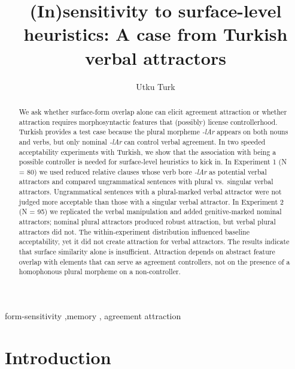 \documentclass[
  authoryear,
  3p]{elsarticle}
\begin{document}
\begin{frontmatter}
\title{(In)sensitivity to surface-level heuristics: A case from Turkish
verbal attractors}
\author[1]{Utku Turk%
%
}



        
\begin{abstract}
We ask whether surface-form overlap alone can elicit agreement
attraction or whether attraction requires morphosyntactic features that
(possibly) license controllerhood. Turkish provides a test case because
the plural morpheme \emph{-lAr} appears on both nouns and verbs, but
only nominal \emph{-lAr} can control verbal agreement. In two speeded
acceptability experiments with Turkish, we show that the association
with being a possible controller is needed for surface-level heuristics
to kick in. In Experiment 1 (N = 80) we used reduced relative clauses
whose verb bore \emph{-lAr} as potential verbal attractors and compared
ungrammatical sentences with plural vs.~singular verbal attractors.
Ungrammatical sentences with a plural-marked verbal attractor were not
judged more acceptable than those with a singular verbal attractor. In
Experiment 2 (N = 95) we replicated the verbal manipulation and added
genitive-marked nominal attractors; nominal plural attractors produced
robust attraction, but verbal plural attractors did not. The
within-experiment distribution influenced baseline acceptability, yet it
did not create attraction for verbal attractors. The results indicate
that surface similarity alone is insufficient. Attraction depends on
abstract feature overlap with elements that can serve as agreement
controllers, not on the presence of a homophonous plural morpheme on a
non-controller.
\end{abstract}





\begin{keyword}
    form-sensitivity \sep memory \sep 
    agreement attraction
\end{keyword}
\end{frontmatter}
    

\section{Introduction}\label{introduction}
\end{document}

